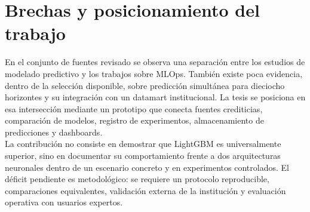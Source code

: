 \section{Brechas y posicionamiento del trabajo}

En el conjunto de fuentes revisado se observa una separación entre los estudios de modelado predictivo y los trabajos sobre MLOps. También existe poca evidencia, dentro de la selección disponible, sobre predicción simultánea para dieciocho horizontes y su integración con un datamart institucional. La tesis se posiciona en esa intersección mediante un prototipo que conecta fuentes crediticias, comparación de modelos, registro de experimentos, almacenamiento de predicciones y dashboards.\\

La contribución no consiste en demostrar que LightGBM es universalmente superior, sino en documentar su comportamiento frente a dos arquitecturas neuronales dentro de un escenario concreto y en experimentos controlados. El déficit pendiente es metodológico: se requiere un protocolo reproducible, comparaciones equivalentes, validación externa de la institución y evaluación operativa con usuarios expertos.
